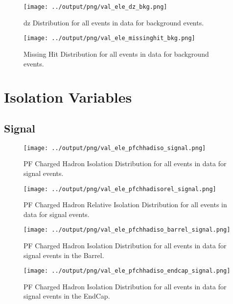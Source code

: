 \documentclass[11pt]{book}
\begin{document}
\begin{figure}[htb]
\centering
\texttt{[image: ../output/png/val\_ele\_dz\_bkg.png]}
\caption{dz Distribution for all events in data for background events.}
\label{fig:val_ele_dz_bkg}
\end{figure}

\begin{figure}[htb]
\centering
\texttt{[image: ../output/png/val\_ele\_missinghit\_bkg.png]}
\caption{Missing Hit Distribution for all events in data for background events.}
\label{fig:val_ele_missinghit_bkg}
\end{figure}
\clearpage


\chapter{Isolation Variables}

\section{Signal}
\begin{figure}[htb]
\centering
\texttt{[image: ../output/png/val\_ele\_pfchhadiso\_signal.png]}
\caption{PF Charged Hadron Isolation Distribution for all events in data for signal events.}
\label{fig:val_ele_pfchhadiso_signal}
\end{figure}

\begin{figure}[htb]
\centering
\texttt{[image: ../output/png/val\_ele\_pfchhadisorel\_signal.png]}
\caption{PF Charged Hadron Relative Isolation Distribution for all events in data for signal events.}
\label{fig:val_ele_pfchhadisorel_signal}
\end{figure}

\begin{figure}[htb]
\centering
\texttt{[image: ../output/png/val\_ele\_pfchhadiso\_barrel\_signal.png]}
\caption{PF Charged Hadron Isolation Distribution for all events in data for signal events in the Barrel.}
\label{fig:val_ele_pfchhadiso_barrel_signal}
\end{figure}

\begin{figure}[htb]
\centering
\texttt{[image: ../output/png/val\_ele\_pfchhadiso\_endcap\_signal.png]}
\caption{PF Charged Hadron Isolation Distribution for all events in data for signal events in the EndCap.}
\label{fig:val_ele_pfchhadiso_endcap_signal}
\end{figure}
\clearpage
\end{document}
